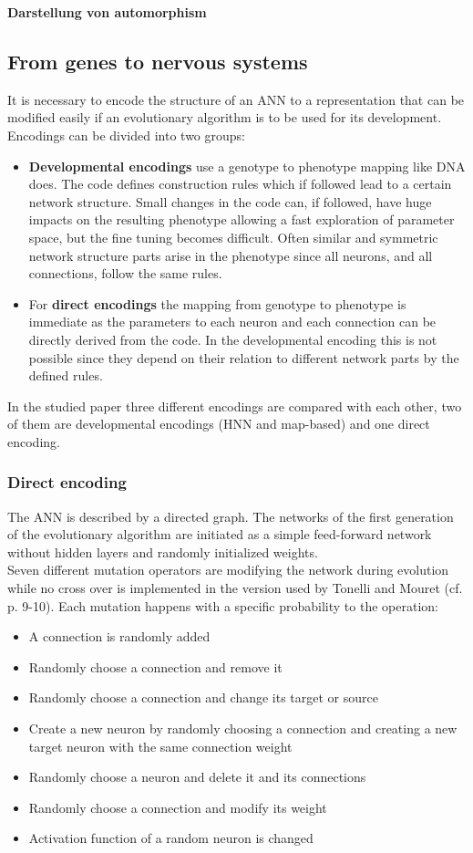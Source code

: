 \documentclass[12pt,twoside]{article}
\theoremstyle{plain}
\theoremstyle{definition}
\theoremstyle{remark}
\begin{document}
\textbf{Darstellung von automorphism}

\subsection{From genes to nervous systems}
\label{genes_nervous}
It is necessary to encode the structure of an ANN to a representation that can be modified easily if an evolutionary algorithm is to be used for its development.
Encodings can be divided into two groups:
\begin{itemize}
	\item \textbf{Developmental encodings} use a genotype to phenotype mapping like DNA does. The code defines construction rules which if followed lead to a certain network structure. Small changes in the code can, if followed, have huge impacts on the resulting phenotype allowing a fast exploration of parameter space, but the fine tuning becomes difficult.
	Often similar and symmetric network structure parts arise in the phenotype since all neurons, and all connections, follow the same rules.
	\item For \textbf{direct encodings} the mapping from genotype to phenotype is immediate as the parameters to each neuron and each connection can be directly derived from the code. In the developmental encoding this is not possible since they depend on their relation to different network parts by the defined rules.
\end{itemize}
In the studied paper three different encodings are compared with each other, two of them are developmental encodings (HNN and map-based) and one direct encoding.

\subsubsection{Direct encoding}
The ANN is described by a directed graph. The networks of the first generation of the evolutionary algorithm are initiated as a simple feed-forward network without hidden layers and randomly initialized weights.\\
Seven different mutation operators are modifying the network during evolution while no cross over is implemented in the version used by Tonelli and Mouret (cf. \cite{citeulike:12788284} p. 9-10).
Each mutation happens with a specific probability to the operation:
\begin{itemize}
	\item A connection is randomly added
	\item Randomly choose a connection and remove it
	\item Randomly choose a connection and change its target or source
	\item Create a new neuron by randomly choosing a connection and creating a new target neuron with the same connection weight
	\item Randomly choose a neuron and delete it and its connections
	\item Randomly choose a connection and modify its weight
	\item Activation function of a random neuron is changed
\end{itemize}
\end{document}
